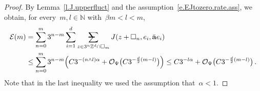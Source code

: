 \documentclass[11pt]{article} %
\makeatletter
\let\oldsquare\square %
\renewcommand{\square}{\oldsquare}
\numberwithin{equation}{section}
\theoremstyle{definition}
\newcommand*{\N}{\ensuremath{\mathbb{N}}}
\newcommand*{\Zd}{\ensuremath{\mathbb{Z}^d}}
\renewcommand{\a}{\mathbf{a}}
\newcommand{\ahom}{\bar{\a}}
\newcommand{\cu}{\square}
\renewcommand{\O}{\mathcal{O}}
\newcommand{\avsum}{\mathop{\mathpalette\avsuminner\relax}\displaylimits}
\newcommand\avsuminner[2]{%
  {\sbox0{$\m@th#1\sum$}%
   \vphantom{\usebox0}%
   \ooalign{%
     \hidewidth
     \smash{\,\rule[.23em]{8.8pt}{1.1pt} \relax}%
     \hidewidth\cr
     $\m@th#1\sum$\cr
   }%
  }%
}
\makeatother
\begin{document}
\begin{proof}
By Lemma~\ref{l.J.upperfluct} and the assumption~\eqref{e.EJtozero.rate.ass}, we obtain, for every~$m,l \in \N$ with~$\beta m < l < m$,
\begin{align}
\label{e.Emestimate}
\mathcal{E}(m)
&
=
\sum_{n=0}^{m}
3^{n-m} \sum_{i=1}^d \avsum_{z \in 3^n\Zd\cap \cu_m} 
 J(z+\cu_n,e_i,\ahom e_i)
\notag \\ & 
\leq 
\sum_{n=0}^{m}
3^{n-m}
\Bigl( 
C3^{-(n\wedge l)\alpha} 
+
\O_\Psi \bigl( C3^{-\frac d2(m-l)} \bigr)
\Bigr)
\leq
C3^{-l\alpha} + \O_\Psi \bigl( C3^{-\frac d2(m-l)} \bigr)
\,.
\end{align}
Note that in the last inequality we used the assumption that~$\alpha<1$. 

\smallskip


\end{proof}
\end{document}
